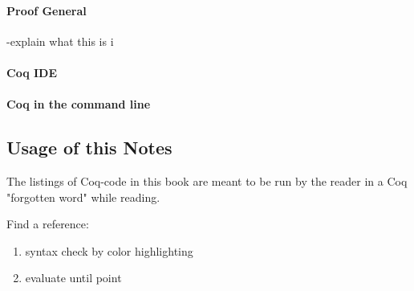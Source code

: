 \paragraph{Proof General}
-explain what this is
i

\paragraph{Coq IDE}

\paragraph{Coq in the command line}




\subsection{Usage of this Notes}


The listings of Coq-code in this book are meant to be run by the reader in a Coq "forgotten word" while reading.

Find a reference:
\begin{enumerate}
\item syntax check by color highlighting
\item evaluate until point
\end{enumerate}




